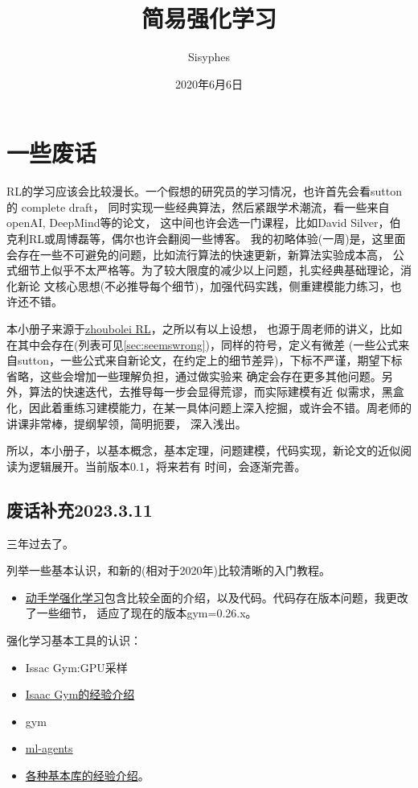\documentclass[UTF8]{ctexart}
\title{简易强化学习}
\author{Sisyphes}
\date{2020年6月6日}
\begin{document}
\maketitle
\tableofcontents
\newpage

\section{一些废话}

RL的学习应该会比较漫长。一个假想的研究员的学习情况，也许首先会看sutton的 complete draft，
同时实现一些经典算法，然后紧跟学术潮流，看一些来自openAI, DeepMind等的论文，
这中间也许会选一门课程，比如David Silver，伯克利RL或周博磊等，偶尔也许会翻阅一些博客。
我的初略体验(一周)是，这里面会存在一些不可避免的问题，比如流行算法的快速更新，新算法实验成本高，
公式细节上似乎不太严格等。为了较大限度的减少以上问题，扎实经典基础理论，消化新论
文核心思想(不必推导每个细节)，加强代码实践，侧重建模能力练习，也许还不错。

本小册子来源于\href{https://github.com/zhoubolei/introRL}{zhoubolei RL}，之所以有以上设想，
也源于周老师的讲义，比如在其中会存在(列表可见\ref{sec:seemswrong})，同样的符号，定义有微差
(一些公式来自sutton，一些公式来自新论文，在约定上的细节差异)，下标不严谨，期望下标省略，这些会增加一些理解负担，通过做实验来
确定会存在更多其他问题。另外，算法的快速迭代，去推导每一步会显得荒谬，而实际建模有近
似需求，黑盒化，因此着重练习建模能力，在某一具体问题上深入挖掘，或许会不错。周老师的讲课非常棒，提纲挈领，简明扼要，
深入浅出。

所以，本小册子，以基本概念，基本定理，问题建模，代码实现，新论文的近似阅读为逻辑展开。当前版本0.1，将来若有
时间，会逐渐完善。

\subsection{废话补充2023.3.11}
三年过去了。

列举一些基本认识，和新的(相对于2020年)比较清晰的入门教程。
\begin{itemize}
    \item \href{https://hrl.boyuai.com/}{动手学强化学习}包含比较全面的介绍，以及代码。代码存在版本问题，我更改了一些细节，
    适应了现在的版本gym=0.26.x。
\end{itemize}

强化学习基本工具的认识：
\begin{itemize}
    \item Issac Gym:GPU采样
    \item \href{https://www.zhihu.com/question/333671830/answer/2387452922}{Isaac Gym的经验介绍}
    \item gym 
    \item \href{https://github.com/Unity-Technologies/ml-agents}{ml-agents}
    \item \href{https://www.zhihu.com/question/333671830/answer/2383509386}{各种基本库的经验介绍}。
\end{itemize}
\end{document}
